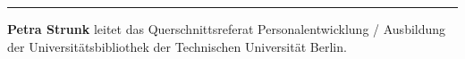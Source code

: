 \begin{center}\rule{0.5\linewidth}{\linethickness}\end{center}

\textbf{Petra Strunk} leitet das Querschnittsreferat Personalentwicklung
/ Ausbildung der Universitätsbibliothek der Technischen Universität
Berlin.
